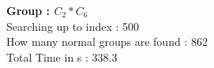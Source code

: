 \textbf{Group : $C_2*C_6$}\\
Searching up to index : 500\\
How many normal groups are found : 862\\
Total Time in s : 338.3\\
